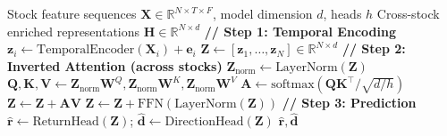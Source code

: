 \documentclass[12pt, a4paper]{article}
\begin{document}
\begin{algorithm}[htbp]
\caption{Inverted Multi-Head Self-Attention for Cross-Stock Modeling}
\begin{algorithmic}[1]
\REQUIRE Stock feature sequences $\mathbf{X} \in \mathbb{R}^{N \times T \times F}$, model dimension $d$, heads $h$
\ENSURE Cross-stock enriched representations $\mathbf{H} \in \mathbb{R}^{N \times d}$
\STATE \textbf{// Step 1: Temporal Encoding}
    \STATE $\mathbf{z}_i \leftarrow \text{TemporalEncoder}(\mathbf{X}_i) + \mathbf{e}_i$ 
\ENDFOR
\STATE $\mathbf{Z} \leftarrow [\mathbf{z}_1, \ldots, \mathbf{z}_N] \in \mathbb{R}^{N \times d}$
\STATE \textbf{// Step 2: Inverted Attention (across stocks)}
    \STATE $\mathbf{Z}_{\text{norm}} \leftarrow \text{LayerNorm}(\mathbf{Z})$
    \STATE $\mathbf{Q}, \mathbf{K}, \mathbf{V} \leftarrow \mathbf{Z}_{\text{norm}} \mathbf{W}^Q, \mathbf{Z}_{\text{norm}} \mathbf{W}^K, \mathbf{Z}_{\text{norm}} \mathbf{W}^V$
    \STATE $\mathbf{A} \leftarrow \text{softmax}(\mathbf{Q} \mathbf{K}^\top / \sqrt{d/h})$ 
    \STATE $\mathbf{Z} \leftarrow \mathbf{Z} + \mathbf{A} \mathbf{V}$ 
    \STATE $\mathbf{Z} \leftarrow \mathbf{Z} + \text{FFN}(\text{LayerNorm}(\mathbf{Z}))$ 
\ENDFOR
\STATE \textbf{// Step 3: Prediction}
\STATE $\hat{\mathbf{r}} \leftarrow \text{ReturnHead}(\mathbf{Z})$; $\hat{\mathbf{d}} \leftarrow \text{DirectionHead}(\mathbf{Z})$
\RETURN $\hat{\mathbf{r}}, \hat{\mathbf{d}}$
\end{algorithmic}
\end{algorithm}
\end{document}
